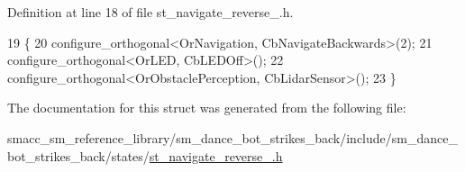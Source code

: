 Definition at line 18 of file st\+\_\+navigate\+\_\+reverse\+\_.\+h.


\begin{DoxyCode}
19    \{
20       configure\_orthogonal<OrNavigation, CbNavigateBackwards>(2);
21       configure\_orthogonal<OrLED, CbLEDOff>();
22       configure\_orthogonal<OrObstaclePerception, CbLidarSensor>();
23    \}
\end{DoxyCode}


The documentation for this struct was generated from the following file\+:\begin{DoxyCompactItemize}
\item 
smacc\+\_\+sm\+\_\+reference\+\_\+library/sm\+\_\+dance\+\_\+bot\+\_\+strikes\+\_\+back/include/sm\+\_\+dance\+\_\+bot\+\_\+strikes\+\_\+back/states/\hyperlink{strikes__back_2include_2sm__dance__bot__strikes__back_2states_2st__navigate__reverse__3_8h}{st\+\_\+navigate\+\_\+reverse\+\_.\+h}\end{DoxyCompactItemize}
